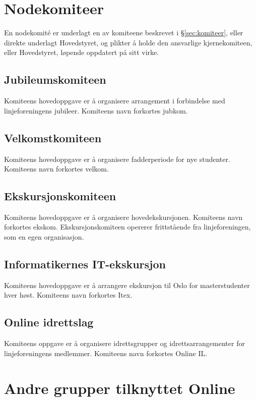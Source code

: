 \section{Nodekomiteer}
\vspace{23pt}
En nodekomité er underlagt en av komiteene beskrevet i §\ref{sec:komiteer}, eller direkte underlagt Hovedstyret, og plikter å holde den ansvarlige kjernekomiteen, eller Hovedstyret, løpende oppdatert på sitt virke.



\subsection{Jubileumskomiteen}{
Komiteens hovedoppgave er å organisere arrangement i forbindelse med linjeforeningens jubileer. Komiteens navn forkortes jubkom.

}

\subsection{Velkomstkomiteen}{
  Komiteens hovedoppgave er å organisere fadderperiode for nye studenter. Komiteens navn forkortes velkom.
}

\subsection{Ekskursjonskomiteen}{
Komiteens hovedoppgave er å organisere hovedekskursjonen. Komiteens navn forkortes ekskom. Ekskursjonskomiteen opererer frittstående fra linjeforeningen, som en egen organisasjon.
}

\subsection{Informatikernes IT-ekskursjon}{
Komiteens hovedoppgave er å arrangere ekskursjon til Oslo for masterstudenter hver høst. Komiteens navn forkortes Itex.
}

\subsection{Online idrettslag}
Komiteens oppgave er å organisere idrettsgrupper og idrettsarrangementer for linjeforeningens medlemmer. Komiteens navn forkortes Online IL.

\section{Andre grupper tilknyttet Online}
\vspace{18pt}

